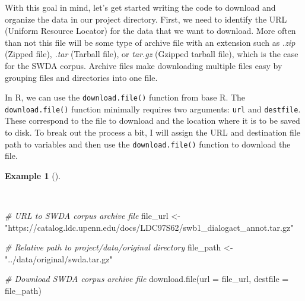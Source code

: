 \documentclass[
  letterpaper,
]{latex/krantz}
\newenvironment{Shaded}{\begin{snugshade}}{\end{snugshade}}
\newcommand{\AttributeTok}[1]{\textcolor[rgb]{0.00,0.00,0.00}{#1}}
\newcommand{\CommentTok}[1]{\textcolor[rgb]{0.00,0.00,0.00}{\textit{#1}}}
\newcommand{\FunctionTok}[1]{\textcolor[rgb]{0.00,0.00,0.00}{#1}}
\newcommand{\NormalTok}[1]{\textcolor[rgb]{0.00,0.00,0.00}{#1}}
\newcommand{\OtherTok}[1]{\textcolor[rgb]{0.00,0.00,0.00}{#1}}
\newcommand{\StringTok}[1]{\textcolor[rgb]{0.00,0.00,0.00}{#1}}
\theoremstyle{definition}
\newtheorem{example}{Example}[chapter]
\theoremstyle{remark}
\begin{document}
With this goal in mind, let's get started writing the code to download
and organize the data in our project directory. First, we need to
identify the URL (Uniform Resource Locator) for the data that we want to
download. More often than not this file will be some type of archive
file with an extension such as \emph{.zip} (Zipped file), \emph{.tar}
(Tarball file), or \emph{tar.gz} (Gzipped tarball file), which is the
case for the SWDA corpus. Archive files make downloading multiple files
easy by grouping files and directories into one file.

In R, we can use the \texttt{download.file()} function from base R. The
\texttt{download.file()} function minimally requires two arguments:
\texttt{url} and \texttt{destfile}. These correspond to the file to
download and the location where it is to be saved to disk. To break out
the process a bit, I will assign the URL and destination file path to
variables and then use the \texttt{download.file()} function to download
the file.

\begin{example}[]\protect\hypertarget{exm-acquire-swda-download-file}{}\label{exm-acquire-swda-download-file}

~

\begin{Shaded}
\begin{Highlighting}[]
\CommentTok{\# URL to SWDA corpus archive file}
\NormalTok{file\_url }\OtherTok{\textless{}{-}}
  \StringTok{"https://catalog.ldc.upenn.edu/docs/LDC97S62/swb1\_dialogact\_annot.tar.gz"}

\CommentTok{\# Relative path to project/data/original directory}
\NormalTok{file\_path }\OtherTok{\textless{}{-}} \StringTok{"../data/original/swda.tar.gz"}

\CommentTok{\# Download SWDA corpus archive file}
\FunctionTok{download.file}\NormalTok{(}\AttributeTok{url =}\NormalTok{ file\_url, }\AttributeTok{destfile =}\NormalTok{ file\_path)}
\end{Highlighting}
\end{Shaded}

\end{example}
\end{document}
